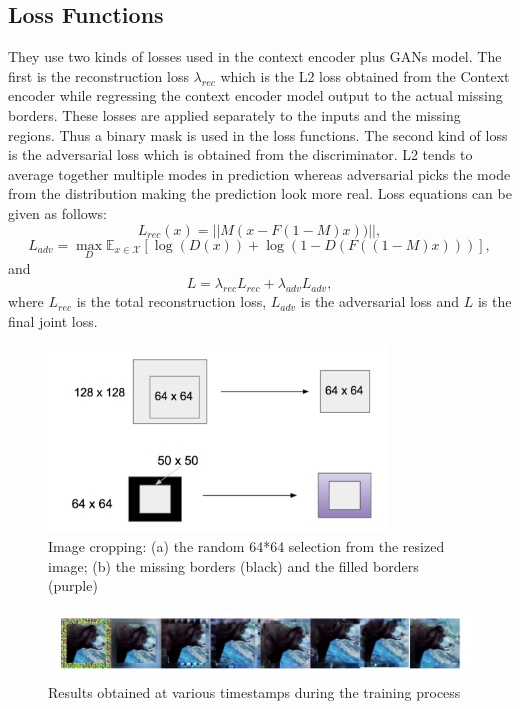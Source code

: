 \documentclass{sig-alternate}
\begin{document}
\subsection{Loss Functions}
They use two kinds of losses used in the context encoder plus GANs model. The first is the reconstruction loss $\lambda_{rec}$ which is the L2 loss obtained from the Context encoder while regressing the context encoder model output to the actual missing borders. These losses are applied separately to the inputs and the missing regions. Thus a binary mask is used in the loss functions. The second kind of loss is the adversarial loss which is obtained from the discriminator. L2 tends to average together multiple modes in prediction whereas adversarial picks the mode from the distribution making the prediction look more real. Loss equations can be given as follows:
\begin{equation}
	L_{rec}(x) = ||M(x-F(1-M)x))||,
\end{equation}
\begin{equation}
	L_{adv} = \max_{D}\mathbb{E}_{x\in\mathcal{X}}[\log(D(x))+\log(1-D(F((1-M)x)))],
\end{equation}
and
\begin{equation}
	L = \lambda_{rec}L_{rec}+\lambda_{adv}L_{adv},
\end{equation}
where $L_{rec}$ is the total reconstruction loss, $L_{adv}$ is the adversarial loss and $L$ is the final joint loss.

\begin{figure}[htb]
	\centering
	\includegraphics[width=9cm]{crop}
	\caption{Image cropping: (a) the random 64*64 selection from the resized image; (b) the missing borders (black) and the filled borders (purple)}
	\label{fig:crop}
\end{figure}

\begin{figure}[htb]
	\centering
	\includegraphics[width=16cm]{timestamp}
	\caption{Results obtained at various timestamps during the training process}
	\label{fig:time}
\end{figure}
\end{document}
